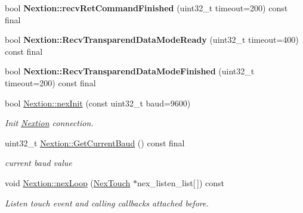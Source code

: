 \begin{DoxyCompactItemize}
\item 
\hypertarget{group___core_a_p_i_ga290d2e855c9357da8d1455f1c75268d6}{}bool {\bfseries Nextion\+::recv\+Ret\+Command\+Finished} (uint32\+\_\+t timeout=200) const final\label{group___core_a_p_i_ga290d2e855c9357da8d1455f1c75268d6}

\item 
\hypertarget{group___core_a_p_i_ga24da11183c7577bc6b7913880edce7bc}{}bool {\bfseries Nextion\+::\+Recv\+Transparend\+Data\+Mode\+Ready} (uint32\+\_\+t timeout=400) const final\label{group___core_a_p_i_ga24da11183c7577bc6b7913880edce7bc}

\item 
\hypertarget{group___core_a_p_i_ga75d1c8a6f05dbd38fb29c23f81fbfd1d}{}bool {\bfseries Nextion\+::\+Recv\+Transparend\+Data\+Mode\+Finished} (uint32\+\_\+t timeout=200) const final\label{group___core_a_p_i_ga75d1c8a6f05dbd38fb29c23f81fbfd1d}

\item 
bool \hyperlink{group___core_a_p_i_ga09f91677e55d7eae09df46d4e9c10fa3}{Nextion\+::nex\+Init} (const uint32\+\_\+t baud=9600)
\begin{DoxyCompactList}\small\item\em Init \hyperlink{class_nextion}{Nextion} connection. \end{DoxyCompactList}\item 
uint32\+\_\+t \hyperlink{group___core_a_p_i_gabda4327daa1285808caeea712e3706cb}{Nextion\+::\+Get\+Current\+Baud} () const final
\begin{DoxyCompactList}\small\item\em current baud value \end{DoxyCompactList}\item 
void \hyperlink{group___core_a_p_i_ga76f9d7df129281503a7cf0b485ef21d2}{Nextion\+::nex\+Loop} (\hyperlink{class_nex_touch}{Nex\+Touch} $\ast$nex\+\_\+listen\+\_\+list\mbox{[}$\,$\mbox{]}) const 
\begin{DoxyCompactList}\small\item\em Listen touch event and calling callbacks attached before. \end{DoxyCompactList}\end{DoxyCompactItemize}
